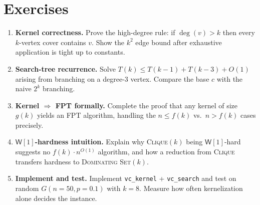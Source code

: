 \section{Exercises}
\label{sec:ch04-exercises}
\begin{enumerate}[label=E4.\arabic*, leftmargin=*, itemsep=0.7em]
    \item \textbf{Kernel correctness.} Prove the high-degree rule: if $\deg(v)>k$ then every $k$-vertex cover contains $v$. Show the $k^2$ edge bound after exhaustive application is tight up to constants.
    \item \textbf{Search-tree recurrence.} Solve $T(k)\le T(k-1)+T(k-3)+O(1)$ arising from branching on a degree-$3$ vertex. Compare the base $c$ with the naive $2^k$ branching.
    \item \textbf{Kernel $\Rightarrow$ FPT formally.} Complete the proof that any kernel of size $g(k)$ yields an FPT algorithm, handling the $n\le f(k)$ vs.\ $n>f(k)$ cases precisely.
    \item \textbf{$\mathsf{W}[1]$-hardness intuition.} Explain why \textsc{Clique}$(k)$ being $\mathsf{W}[1]$-hard suggests no $f(k)\cdot n^{O(1)}$ algorithm, and how a reduction from \textsc{Clique} transfers hardness to \textsc{Dominating Set}$(k)$.
    \item \textbf{Implement and test.} Implement \texttt{vc\_kernel} + \texttt{vc\_search} and test on random $G(n=50,p=0.1)$ with $k=8$. Measure how often kernelization alone decides the instance.
\end{enumerate}
